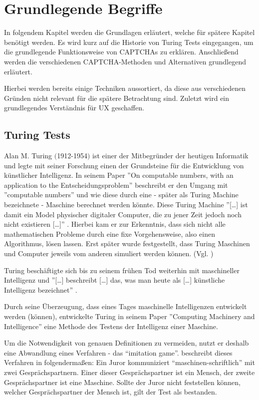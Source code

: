 \chapter{Grundlegende Begriffe}
\label{ch:basics}
In folgendem Kapitel werden die Grundlagen erläutert, welche für spätere Kapitel benötigt werden. 
Es wird kurz auf die Historie von Turing Tests eingegangen, um die grundlegende Funktionsweise von CAPTCHAs zu erklären.
Anschließend werden die verschiedenen CAPTCHA-Methoden und Alternativen grundlegend erläutert. 

Hierbei werden bereits einige Techniken aussortiert, da diese aus verschiedenen Gründen nicht relevant für die spätere Betrachtung sind.
Zuletzt wird ein grundlegendes Verständnis für UX geschaffen.

\section{Turing Tests}
\label{ch:basics:turing}
Alan M. Turing $($1912-1954$)$ ist einer der Mitbegründer der heutigen Informatik 
und legte mit seiner Forschung einen der Grundsteine für die Entwicklung von künstlicher Intelligenz. 
In seinem Paper ''On computable numbers, with an application to the Entscheidungsproblem'' \cite{turing} 
beschreibt er den Umgang mit ''computable numbers'' und wie diese durch eine - später als Turing Machine bezeichnete - Maschine berechnet werden könnte.
Diese Turing Machine ''[\dots] ist damit ein Model physischer digitaler Computer, die zu jener Zeit jedoch noch nicht existieren [\dots]'' \cite[p.4]{pallay2020turing}.
Hierbei kam er zur Erkenntnis, dass sich nicht alle mathematischen Probleme durch eine fixe Vorgehensweise, also einen Algorithmus, lösen lassen. 
Erst später wurde festgestellt, dass Turing Maschinen und Computer jeweils vom anderen simuliert werden können. (Vgl.\cite[p.647]{geniusofturing} \cite[p.4]{pallay2020turing}) %

Turing beschäftigte sich bis zu seinem frühen Tod weiterhin mit maschineller Intelligenz 
und ''[\dots] beschreibt [\dots] das, was man heute als [\dots] künstliche Intelligenz bezeichnet'' \cite[p.10]{pallay2020turing}.

Durch seine Überzeugung, dass eines Tages maschinelle Intelligenzen entwickelt werden (können), 
entwickelte Turing in seinem Paper ''Computing Machinery and Intelligence'' \cite[p.23ff]{turing2009computing} 
eine Methode des Testens der Intelligenz einer Maschine. 

Um die Notwendigkeit von genauen Definitionen zu vermeiden, nutzt er deshalb eine Abwandlung eines Verfahren - das ``imitation game''. 
\citeauthor{pallay2020turing} beschreibt dieses Verfahren in \cite[p.11ff]{pallay2020turing} folgendermaßen:
Ein Juror kommuniziert ``maschinen-schriftlich'' mit zwei Gesprächspartnern. Einer dieser Gesprächspartner ist ein Mensch, der zweite Gesprächspartner ist eine Maschine.
Sollte der Juror nicht feststellen können, welcher Gesprächspartner der Mensch ist, gilt der Test als bestanden.

